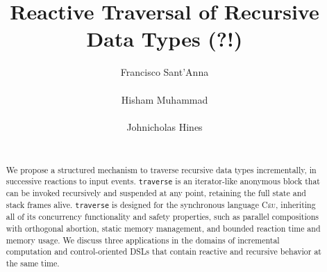 \documentclass{acm_proc_article-sp}
\newcommand{\CEU}{\textsc{C\'{e}u}\xspace}
\newcommand{\code}[1] {{\small{\texttt{#1}}}}
\begin{document}
\title{Reactive Traversal of Recursive Data Types (?!)}

\author{
\alignauthor
Francisco Sant'Anna \\
     \\
\alignauthor
Hisham Muhammad \\
     \\
\alignauthor
Johnicholas Hines \\
     \\
}

\maketitle
\begin{abstract}
We propose a structured mechanism to traverse recursive data types 
incrementally, in successive reactions to input events.
\code{traverse} is an iterator-like anonymous block that can be invoked 
recursively and suspended at any point, retaining the full state and stack 
frames alive.
\code{traverse} is designed for the synchronous language \CEU, inheriting all 
of its concurrency functionality and safety properties, such as parallel 
compositions with orthogonal abortion, static memory management, and bounded 
reaction time and memory usage.
We discuss three applications in the domains of incremental computation and 
control-oriented DSLs that contain reactive and recursive behavior at the same 
time.

\begin{comment}
MIX OF:
\begin{itemize}
    \item recursive calls to anonymous closures
    \item each instance---many co-routines
\end{itemize}

DESIGNED FOR \CEU:
\begin{itemize}
    \item lexical compositions
    \item static memory management
    \item bounded execution/memory
    \item reactive
    \item mutation
\end{itemize}
\end{comment}

\end{abstract}
\end{document}
